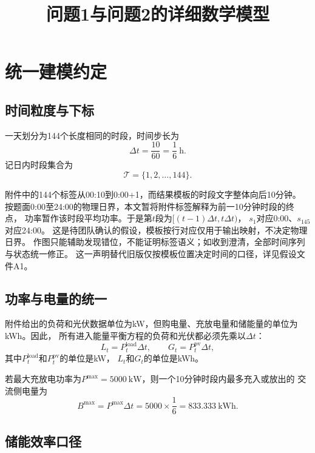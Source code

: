 \documentclass[UTF8,11pt]{ctexart}
\title{问题1与问题2的详细数学模型}
\author{}
\date{}
\begin{document}
\maketitle

\section{统一建模约定}

\subsection{时间粒度与下标}

一天划分为144个长度相同的时段，时间步长为
\begin{equation}
    \Delta t=\frac{10}{60}=\frac{1}{6}\ \mathrm{h}.
\end{equation}
记日内时段集合为
\begin{equation}
    \mathcal{T}=\{1,2,\ldots,144\}.
\end{equation}

附件中的144个标签从00:10到0:00+1，而结果模板的时段文字整体向后10分钟。
按题面0:00至24:00的物理日界，本文暂将附件标签解释为前一10分钟时段的终点，
功率暂作该时段平均功率。于是第$t$段为$[(t-1)\Delta t,t\Delta t)$，
$s_1$对应0:00、$s_{145}$对应24:00。
这是待团队确认的假设，模板按行对应仅用于输出映射，不决定物理日界。
作图只能辅助发现错位，不能证明标签语义；如收到澄清，全部时间序列与状态统一修正。
这一声明替代旧版仅按模板位置决定时间的口径，详见假设文件A1。

\subsection{功率与电量的统一}

附件给出的负荷和光伏数据单位为kW，但购电量、充放电量和储能量的单位为kWh。因此，
所有进入能量平衡方程的负荷和光伏都必须先乘以$\Delta t$：
\begin{equation}
    L_t=P^{\mathrm{load}}_t\Delta t,\qquad
    G_t=P^{\mathrm{pv}}_t\Delta t,
\end{equation}
其中$P^{\mathrm{load}}_t$和$P^{\mathrm{pv}}_t$的单位是kW，
$L_t$和$G_t$的单位是kWh。

若最大充放电功率为$P^{\max}=5000\ \mathrm{kW}$，则一个10分钟时段内最多充入或放出的
交流侧电量为
\begin{equation}
    B^{\max}=P^{\max}\Delta t=5000\times\frac{1}{6}
    =833.333\ \mathrm{kWh}.
\end{equation}

\subsection{储能效率口径}
\end{document}
